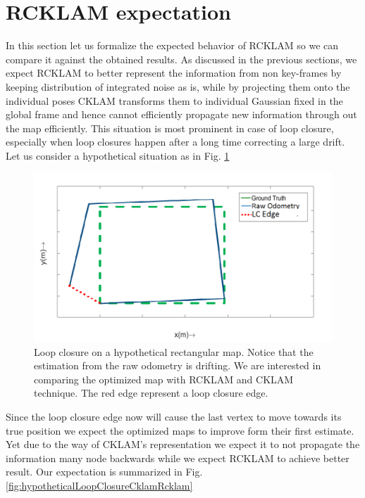 \section{RCKLAM expectation}
\label{sec:RCKLAMExpectation}
In this section let us formalize the expected behavior of RCKLAM so we can compare it against the obtained results. As discussed in the previous sections, we expect RCKLAM to better represent the information from non key-frames by keeping distribution of integrated noise as is, while by projecting them onto the individual poses CKLAM transforms them to individual Gaussian fixed in the global frame and hence cannot efficiently propagate new information through out the map efficiently. This situation is most prominent in case of loop closure, especially when loop closures happen after a long time correcting a large drift. Let us consider a hypothetical situation as in Fig. \ref{fig:hypotheticalLoopClosure}
\begin{figure}
	\centering
		\includegraphics[width=1.00\textwidth]{images/hypotheticalLoopClosure.png}
  \caption{Loop closure on a hypothetical rectangular map. Notice that the estimation from the raw odometry is drifting. We are interested in comparing the optimized map with RCKLAM and CKLAM technique. The red edge represent a loop closure edge.}
  \label{fig:hypotheticalLoopClosure}
\end{figure}
Since the loop closure edge now will cause the last vertex to move towards its true position we expect the optimized maps to improve form their first estimate. Yet due to the way of CKLAM's representation we expect it to not propagate the information many node backwards while we expect RCKLAM to achieve better result. Our expectation is summarized in Fig. \ref{fig:hypotheticalLoopClosureCklamRcklam}
